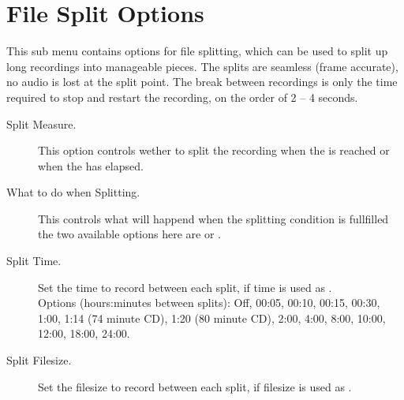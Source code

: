 
      
\section{File Split Options}
  This sub menu contains options for file splitting, which can be used to split
  up long recordings into manageable pieces. The splits are seamless (frame
  accurate), no audio is lost at the split point. The break between recordings
  is only the time required to stop and restart the recording, on the order of
  2 -- 4 seconds.
  \begin{description}
    \item[Split Measure.]
      This option controls wether to split the recording when the
       is reached or when the
       has elapsed.

    \item[What to do when Splitting.]
      This controls what will happend when the splitting condition is
      fullfilled the two available options here are
       or .

    \item[Split Time.]
      Set the time to record between each split, if time is used as
      .\\
      Options (hours:minutes between splits): Off, 00:05, 00:10, 00:15, 00:30,
      1:00, 1:14 (74 minute CD), 1:20 (80 minute CD), 2:00, 4:00, 8:00, 10:00,
      12:00, 18:00, 24:00.

    \item[Split Filesize.]
      Set the filesize to record between each split, if filesize is used as
      .

  \end{description}

